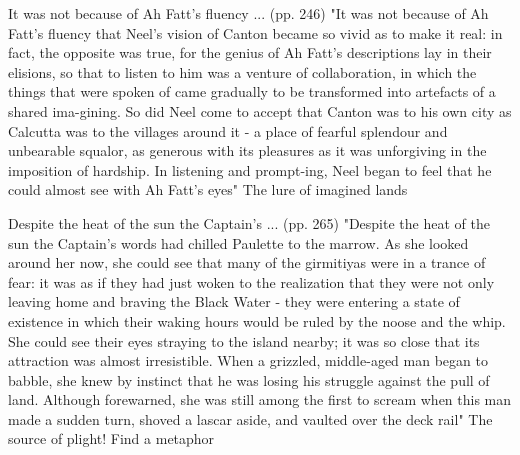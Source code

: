It was not because of Ah Fatt’s fluency ... (pp. 246)
"It was not because of Ah Fatt’s fluency that Neel’s vision of Canton became so vivid as to make it real: in fact, the opposite was true, for the genius of Ah Fatt’s descriptions lay in their elisions, so that to listen to him was a venture of collaboration, in which the things that were spoken of came gradually to be transformed into artefacts of a shared ima-gining. So did Neel come to accept that Canton was to his own city as Calcutta was to the villages around it - a place of fearful splendour and unbearable squalor, as generous with its pleasures as it was unforgiving in the imposition of hardship. In listening and prompt-ing, Neel began to feel that he could almost see with Ah Fatt’s eyes"
The lure of imagined lands

Despite the heat of the sun the Captain’s ... (pp. 265)
"Despite the heat of the sun the Captain’s words had chilled Paulette to the marrow. As she looked around her now, she could see that many of the girmitiyas were in a trance of fear: it was as if they had just woken to the realization that they were not only leaving home and braving the Black Water - they were entering a state of existence in which their waking hours would be ruled by the noose and the whip. She could see their eyes straying to the island nearby; it was so close that its attraction was almost irresistible. When a grizzled, middle-aged man began to babble, she knew by instinct that he was losing his struggle against the pull of land. Although forewarned, she was still among the first to scream when this man made a sudden turn, shoved a lascar aside, and vaulted over the deck rail"
The source of plight! Find a metaphor
    